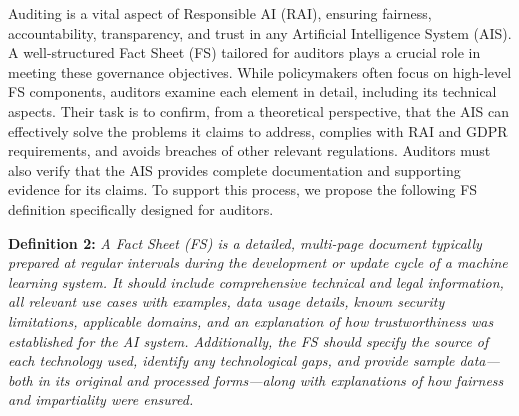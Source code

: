 \documentclass[manuscript,screen,review]{acmart}
\begin{document}
	Auditing is a vital aspect of Responsible AI (RAI), ensuring fairness, accountability, transparency, and trust in any Artificial Intelligence System (AIS). A well-structured Fact Sheet (FS) tailored for auditors plays a crucial role in meeting these governance objectives. While policymakers often focus on high-level FS components, auditors examine each element in detail, including its technical aspects. Their task is to confirm, from a theoretical perspective, that the AIS can effectively solve the problems it claims to address, complies with RAI and GDPR requirements, and avoids breaches of other relevant regulations. Auditors must also verify that the AIS provides complete documentation and supporting evidence for its claims. To support this process, we propose the following FS definition specifically designed for auditors.

	

	\textbf{Definition 2: }\textit{A Fact Sheet (FS) is a detailed, multi-page document typically prepared at regular intervals during the development or update cycle of a machine learning system. It should include comprehensive technical and legal information, all relevant use cases with examples, data usage details, known security limitations, applicable domains, and an explanation of how trustworthiness was established for the AI system. Additionally, the FS should specify the source of each technology used, identify any technological gaps, and provide sample data—both in its original and processed forms—along with explanations of how fairness and impartiality were ensured.}
\end{document}
